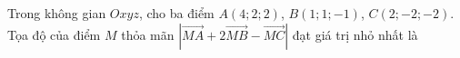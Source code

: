 \begin{ex}
Trong không gian $Oxyz$, cho ba điểm $A(4;2;2)$, $B(1;1;-1)$, $C(2;-2;-2)$. Tọa độ của điểm $M$ thỏa mãn $\left|\overrightarrow{MA}+2\overrightarrow{MB}-\overrightarrow{MC}\right|$ đạt giá trị nhỏ nhất là
\end{ex}
